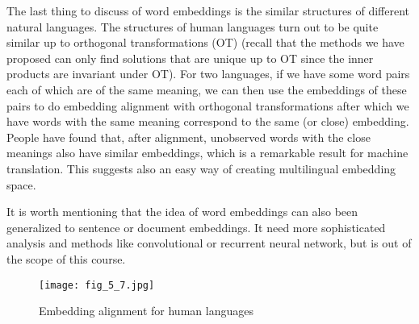 \documentclass[../book-template.tex]{subfiles}
\begin{document}
\par The last thing to discuss of word embeddings is the similar structures of different natural languages. The structures of human languages turn out to be quite similar up to orthogonal transformations (OT) (recall that the methods we have proposed can only find solutions that are unique up to OT since the inner products are invariant under OT). For two languages, if we have some word pairs each of which are of the same meaning, we can then use the embeddings of these pairs to do embedding alignment with orthogonal transformations after which we have words with the same meaning correspond to the same (or close) embedding. People have found that, after alignment, unobserved words with the close meanings also have similar embeddings, which is a remarkable result for machine translation. This suggests also an easy way of creating multilingual embedding space.
\par It is worth mentioning that the idea of word embeddings can also been generalized to sentence or document embeddings. It need more sophisticated analysis and methods like convolutional or recurrent neural network, but is out of the scope of this course.
\begin{figure}[h] 
	\centering 
	\texttt{[image: fig\_5\_7.jpg]} 
	\caption{Embedding alignment for human languages}\label{fig_5_7}
\end{figure}
\end{document}
